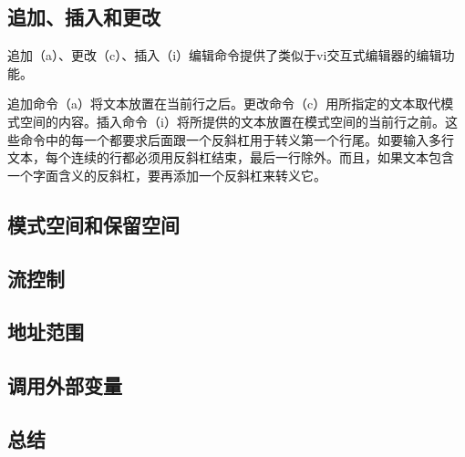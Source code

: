 \subsection{追加、插入和更改}
\label{subsec:appendInsertChange}

追加（a）、更改（c）、插入（i）编辑命令提供了类似于vi交互式编辑器的编辑功能。

追加命令（a）将文本放置在当前行之后。更改命令（c）用所指定的文本取代模
式空间的内容。插入命令（i）将所提供的文本放置在模式空间的当前行之前。这
些命令中的每一个都要求后面跟一个反斜杠用于转义第一个行尾。如要输入多行
文本，每个连续的行都必须用反斜杠结束，最后一行除外。而且，如果文本包含
一个字面含义的反斜杠，要再添加一个反斜杠来转义它。

\subsection{模式空间和保留空间}
\label{subsec:patternSpace}

\subsection{流控制}
\label{subsec:flowControl}

\subsection{地址范围}
\label{subsec:addrSpace}

\subsection{调用外部变量}
\label{subsec:callExternalVariable}

\subsection{总结}
\label{subsec:summary}

